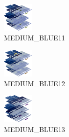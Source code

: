\hspace{0.1cm}
\begin{minipage}[b]{0.15\linewidth}
\begin{figure}[H]                                                          
  \centering                                                             
  \begin{adjustbox}{width=1.5cm,center}                                   
  \includegraphics[width=1.5cm]{src/colorspace_colourflow/flows/colourflow_139-45.png}%
  \end{adjustbox}                                                        
\caption*{MEDIUM\_BLUE11}                                           
\end{figure}                                                               
\end{minipage}
\hspace{0.1cm}
\begin{minipage}[b]{0.15\linewidth}
\begin{figure}[H]                                                          
  \centering                                                             
  \begin{adjustbox}{width=1.5cm,center}                                   
  \includegraphics[width=1.5cm]{src/colorspace_colourflow/flows/colourflow_140-45.png}%
  \end{adjustbox}                                                        
\caption*{MEDIUM\_BLUE12}                                           
\end{figure}                                                               
\end{minipage}
\hspace{0.1cm}
\begin{minipage}[b]{0.15\linewidth}
\begin{figure}[H]                                                          
  \centering                                                             
  \begin{adjustbox}{width=1.5cm,center}                                   
  \includegraphics[width=1.5cm]{src/colorspace_colourflow/flows/colourflow_141-45.png}%
  \end{adjustbox}                                                        
\caption*{MEDIUM\_BLUE13}                                           
\end{figure}                                                               
\end{minipage}
